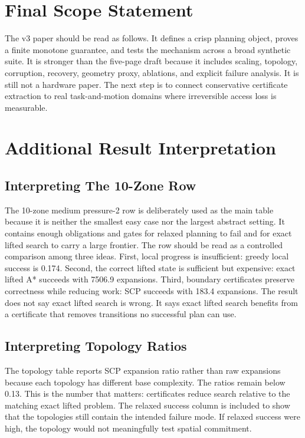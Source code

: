 \documentclass{article}
\begin{document}
\section{Final Scope Statement}

The v3 paper should be read as follows. It defines a crisp planning object, proves a finite monotone guarantee, and tests the mechanism across a broad synthetic suite. It is stronger than the five-page draft because it includes scaling, topology, corruption, recovery, geometry proxy, ablations, and explicit failure analysis. It is still not a hardware paper. The next step is to connect conservative certificate extraction to real task-and-motion domains where irreversible access loss is measurable.

\section{Additional Result Interpretation}

\subsection{Interpreting The 10-Zone Row}

The 10-zone medium pressure-2 row is deliberately used as the main table because it is neither the smallest easy case nor the largest abstract setting. It contains enough obligations and gates for relaxed planning to fail and for exact lifted search to carry a large frontier. The row should be read as a controlled comparison among three ideas. First, local progress is insufficient: greedy local success is 0.174. Second, the correct lifted state is sufficient but expensive: exact lifted A* succeeds with 7506.9 expansions. Third, boundary certificates preserve correctness while reducing work: SCP succeeds with 183.4 expansions. The result does not say exact lifted search is wrong. It says exact lifted search benefits from a certificate that removes transitions no successful plan can use.

\subsection{Interpreting Topology Ratios}

The topology table reports SCP expansion ratio rather than raw expansions because each topology has different base complexity. The ratios remain below 0.13. This is the number that matters: certificates reduce search relative to the matching exact lifted problem. The relaxed success column is included to show that the topologies still contain the intended failure mode. If relaxed success were high, the topology would not meaningfully test spatial commitment.
\end{document}

